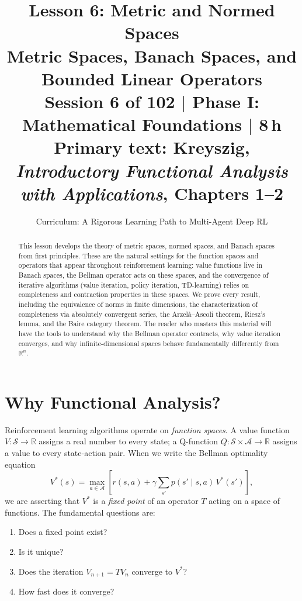\documentclass[11pt,a4paper]{article}
\title{\textbf{Lesson 6: Metric and Normed Spaces}\\[10pt]
\large Metric Spaces, Banach Spaces, and Bounded Linear Operators\\[5pt]
\normalsize Session 6 of 102 $\mid$ Phase I: Mathematical Foundations $\mid$ 8\,h\\
\normalsize Primary text: Kreyszig, \emph{Introductory Functional Analysis with Applications}, Chapters 1--2}
\author{Curriculum: A Rigorous Learning Path to Multi-Agent Deep RL}
\date{}
\theoremstyle{definition}
\theoremstyle{plain}
\theoremstyle{remark}
\newcommand{\R}{\mathbb{R}}
\begin{document}
\maketitle

\begin{abstract}
This lesson develops the theory of metric spaces, normed spaces, and Banach spaces
from first principles. These are the natural settings for the function spaces and
operators that appear throughout reinforcement learning: value functions live in
Banach spaces, the Bellman operator acts on these spaces, and the convergence of
iterative algorithms (value iteration, policy iteration, TD-learning) relies on
completeness and contraction properties in these spaces. We prove every result,
including the equivalence of norms in finite dimensions, the characterization of
completeness via absolutely convergent series, the Arzel\`{a}--Ascoli theorem,
Riesz's lemma, and the Baire category theorem. The reader who masters this
material will have the tools to understand why the Bellman operator contracts,
why value iteration converges, and why infinite-dimensional spaces behave
fundamentally differently from $\R^n$.
\end{abstract}

\tableofcontents
\newpage

\section{Why Functional Analysis?}
\label{sec:intro}

Reinforcement learning algorithms operate on \emph{function spaces}. A value
function $V \colon \mathcal{S} \to \R$ assigns a real number to every state; a
Q-function $Q \colon \mathcal{S} \times \mathcal{A} \to \R$ assigns a value to
every state-action pair. When we write the Bellman optimality equation
\begin{equation}
\label{eq:bellman_intro}
V^*(s) = \max_{a \in \mathcal{A}} \left[ r(s,a) + \gamma \sum_{s'} p(s' \mid s,a)\, V^*(s') \right],
\end{equation}
we are asserting that $V^*$ is a \emph{fixed point} of an operator $T$ acting on
a space of functions. The fundamental questions are:

\begin{enumerate}[nosep]
    \item Does a fixed point exist?
    \item Is it unique?
    \item Does the iteration $V_{n+1} = T V_n$ converge to $V^*$?
    \item How fast does it converge?
\end{enumerate}
\end{document}
